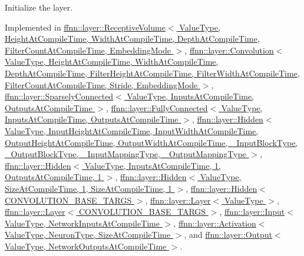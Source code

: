 Initialize the layer. 



Implemented in \hyperlink{classffnn_1_1layer_1_1_receptive_volume_a0fc5e18276c0f5d9f052d4a92349ca48}{ffnn\-::layer\-::\-Receptive\-Volume$<$ Value\-Type, Height\-At\-Compile\-Time, Width\-At\-Compile\-Time, Depth\-At\-Compile\-Time, Filter\-Count\-At\-Compile\-Time, Embedding\-Mode $>$}, \hyperlink{classffnn_1_1layer_1_1_convolution_a158af9a753113ac55730abd7b56b8684}{ffnn\-::layer\-::\-Convolution$<$ Value\-Type, Height\-At\-Compile\-Time, Width\-At\-Compile\-Time, Depth\-At\-Compile\-Time, Filter\-Height\-At\-Compile\-Time, Filter\-Width\-At\-Compile\-Time, Filter\-Count\-At\-Compile\-Time, Stride, Embedding\-Mode $>$}, \hyperlink{classffnn_1_1layer_1_1_sparsely_connected_abb2966b5e7813c43ae2ea5448188a9fb}{ffnn\-::layer\-::\-Sparsely\-Connected$<$ Value\-Type, Inputs\-At\-Compile\-Time, Outputs\-At\-Compile\-Time $>$}, \hyperlink{classffnn_1_1layer_1_1_fully_connected_aec414194202f845b866b0e8b2a51235c}{ffnn\-::layer\-::\-Fully\-Connected$<$ Value\-Type, Inputs\-At\-Compile\-Time, Outputs\-At\-Compile\-Time $>$}, \hyperlink{classffnn_1_1layer_1_1_hidden_a3b5458a771fcf2371376049d85afbc92}{ffnn\-::layer\-::\-Hidden$<$ Value\-Type, Input\-Height\-At\-Compile\-Time, Input\-Width\-At\-Compile\-Time, Output\-Height\-At\-Compile\-Time, Output\-Width\-At\-Compile\-Time, \-\_\-\-Input\-Block\-Type, \-\_\-\-Output\-Block\-Type, \-\_\-\-Input\-Mapping\-Type, \-\_\-\-Output\-Mapping\-Type $>$}, \hyperlink{classffnn_1_1layer_1_1_hidden_a3b5458a771fcf2371376049d85afbc92}{ffnn\-::layer\-::\-Hidden$<$ Value\-Type, Inputs\-At\-Compile\-Time, 1, Outputs\-At\-Compile\-Time, 1 $>$}, \hyperlink{classffnn_1_1layer_1_1_hidden_a3b5458a771fcf2371376049d85afbc92}{ffnn\-::layer\-::\-Hidden$<$ Value\-Type, Size\-At\-Compile\-Time, 1, Size\-At\-Compile\-Time, 1 $>$}, \hyperlink{classffnn_1_1layer_1_1_hidden_a3b5458a771fcf2371376049d85afbc92}{ffnn\-::layer\-::\-Hidden$<$ C\-O\-N\-V\-O\-L\-U\-T\-I\-O\-N\-\_\-\-B\-A\-S\-E\-\_\-\-T\-A\-R\-G\-S $>$}, \hyperlink{classffnn_1_1layer_1_1_layer_ae8a7daa81382a7965b8ab8861da7e522}{ffnn\-::layer\-::\-Layer$<$ Value\-Type $>$}, \hyperlink{classffnn_1_1layer_1_1_layer_ae8a7daa81382a7965b8ab8861da7e522}{ffnn\-::layer\-::\-Layer$<$ C\-O\-N\-V\-O\-L\-U\-T\-I\-O\-N\-\_\-\-B\-A\-S\-E\-\_\-\-T\-A\-R\-G\-S $>$}, \hyperlink{classffnn_1_1layer_1_1_input_ac3de713973a8f67dc348a088ab6dbe1c}{ffnn\-::layer\-::\-Input$<$ Value\-Type, Network\-Inputs\-At\-Compile\-Time $>$}, \hyperlink{classffnn_1_1layer_1_1_activation_ae73ef2d36d9c5ce3c219f6a51cba3c35}{ffnn\-::layer\-::\-Activation$<$ Value\-Type, Neuron\-Type, Size\-At\-Compile\-Time $>$}, and \hyperlink{classffnn_1_1layer_1_1_output_ab9ebd05595bc6b75718191aa48e70ad2}{ffnn\-::layer\-::\-Output$<$ Value\-Type, Network\-Outputs\-At\-Compile\-Time $>$}.

